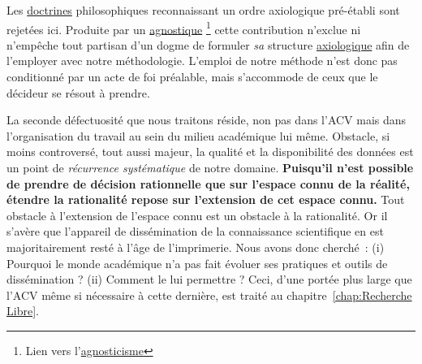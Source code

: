 Les \href{http://www.cnrtl.fr/definition/doctrine}{doctrines} philosophiques reconnaissant un ordre axiologique pré-établi sont rejetées ici.
Produite par un \href{http://www.cnrtl.fr/definition/agnostique}{agnostique}
\footnote{Lien vers l'\href{http://www.cnrtl.fr/definition/agnosticisme}{agnosticisme}}
cette contribution n'exclue ni n’empêche tout partisan d'un dogme de formuler \emph{sa} structure \href{http://www.cnrtl.fr/definition/axiologie}{axiologique} afin de l'employer avec notre méthodologie. %
L'emploi de notre méthode n'est donc pas conditionné par un acte de foi préalable, mais s’accommode de ceux que le décideur se résout à prendre.

La seconde défectuosité que nous traitons réside, non pas dans l'\gls{ACV} mais dans l'organisation du travail au sein du milieu académique lui même.
Obstacle, si moins controversé, tout aussi majeur, la qualité et la disponibilité des données est un point de \textit{récurrence systématique} de notre domaine.
\textbf{Puisqu'il n'est possible de prendre de décision rationnelle que sur l'espace connu de la réalité, étendre la rationalité repose sur l'extension de cet espace connu.}
Tout obstacle à l'extension de l'espace connu est un obstacle à la rationalité.
Or il s'avère que l'appareil de dissémination de la connaissance scientifique en est majoritairement resté à l'âge de l'imprimerie.
Nous avons donc cherché~:
(i) Pourquoi le monde académique n'a pas fait évoluer ses pratiques et outils de dissémination ? (ii) Comment le lui permettre ?
Ceci, d'une portée plus large que l'ACV même si nécessaire à cette dernière, est traité au chapitre~\ref{chap:Recherche Libre}.

%
%
%